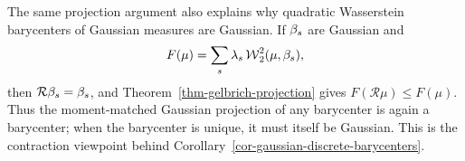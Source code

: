 \begin{rem}
	The same projection argument also explains why quadratic Wasserstein barycenters of Gaussian measures are Gaussian. If $\beta_s$ are Gaussian and
	\[
		F(\mu)=\sum_s\lambda_s\operatorname{\mathcal{W}}_2^2(\mu,\beta_s),
	\]
	then $\mathcal R\beta_s=\beta_s$, and Theorem~\ref{thm-gelbrich-projection} gives $F(\mathcal R\mu)\leq F(\mu)$. Thus the moment-matched Gaussian projection of any barycenter is again a barycenter; when the barycenter is unique, it must itself be Gaussian. This is the contraction viewpoint behind Corollary~\ref{cor-gaussian-discrete-barycenters}.
\end{rem}
